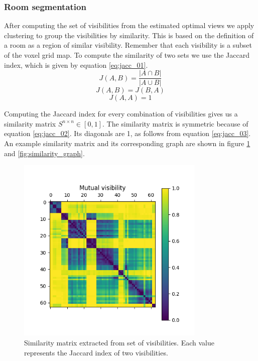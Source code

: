 \subsubsection{Room segmentation}
After computing the set of visibilities from the estimated optimal views we apply clustering to group the visibilities by similarity. This is based on the definition of a room as a region of similar visibility. Remember that each visibility is a subset of the voxel grid map. To compute the similarity of two sets we use the Jaccard index, which is given by equation \ref{eq:jacc_01}.
\begin{equation}
    \label{eq:jacc_01}
    J(A,B) = \frac{|A \cap B|}{|A \cup B|}
\end{equation}
\begin{equation}
    \label{eq:jacc_02}
    J(A,B) = J(B,A)
\end{equation}
\begin{equation}
    \label{eq:jacc_03}
    J(A,A) = 1
\end{equation}

Computing the Jaccard index for every combination of visibilities gives us a similarity matrix \(S^{n \times n} \in [0, 1]\). The similarity matrix is symmetric because of equation \ref{eq:jacc_02}. Its diagonals are 1, as follows from equation \ref{eq:jacc_03}. An example similarity matrix and its corresponding graph are shown in figure \ref{fig:jaccard} and \ref{fig:similarity_graph}.

\begin{figure}[h]
    \centering
    \includegraphics*[width=0.8\textwidth]{./fig/mutual_visibility_matrix.png}
    \caption{Similarity matrix extracted from set of visibilities. Each value represents the Jaccard index of two visibilities.}
    \label{fig:jaccard}
\end{figure}

